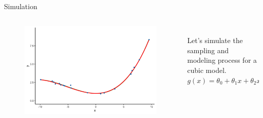 \documentclass[aspectratio=169]{../latex_main/tntbeamer}  %
\begin{document}
	
	\begin{frame}[c]{Simulation}
	  \begin{columns}
	      \begin{column}{.6\textwidth}
	           \begin{figure}
	               \includegraphics[scale=.5]{Bild11}
	           \end{figure} 
	      \end{column}
	      
	      \begin{column}{.4\textwidth}
	      \\
	      \bigskip
	      \bigskip
	      \bigskip
	            Let’s simulate the sampling and modeling process for a cubic model.\\
	            $g(x) = \theta_0 + \theta_1x + \theta_2x^2 + \theta_3x^3$
	      \end{column}
	  \end{columns}
	\end{frame}
	
	
	
\end{document}
